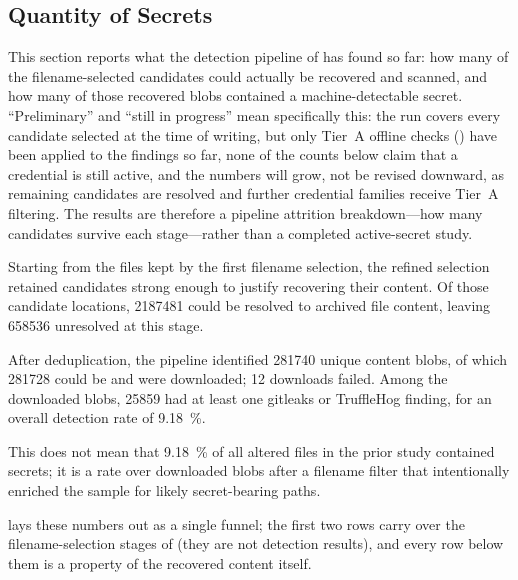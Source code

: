 \subsection{Quantity of Secrets}

This section reports what the detection pipeline of  has found so far: how many of the filename-selected candidates could actually be recovered and scanned, and how many of those recovered blobs contained a machine-detectable secret.
``Preliminary'' and ``still in progress'' mean specifically this: the run covers every candidate selected at the time of writing, but only Tier~A offline checks () have been applied to the findings so far, none of the counts below claim that a credential is still active, and the numbers will grow, not be revised downward, as remaining candidates are resolved and further credential families receive Tier~A filtering.
The results are therefore a pipeline attrition breakdown---how many candidates survive each stage---rather than a completed active-secret study.

Starting from the \SecretFirstExtractionShort files kept by the first filename selection, the refined selection retained \SecretSecondExtractionShort candidates strong enough to justify recovering their content.
Of those candidate locations, \num{2187481} could be resolved to archived file content, leaving \num{658536} unresolved at this stage.

After deduplication, the pipeline identified \num{281740} unique content blobs, of which \num{281728} could be and were downloaded; \num{12} downloads failed.
Among the downloaded blobs, \num{25859} had at least one gitleaks or TruffleHog finding, for an overall detection rate of \SI{9.18}{\percent}.

This does not mean that \SI{9.18}{\percent} of all altered files in the prior study contained secrets; it is a rate over downloaded blobs after a filename filter that intentionally enriched the sample for likely secret-bearing paths.

 lays these numbers out as a single funnel; the first two rows carry over the filename-selection stages of  (they are not detection results), and every row below them is a property of the recovered content itself.

